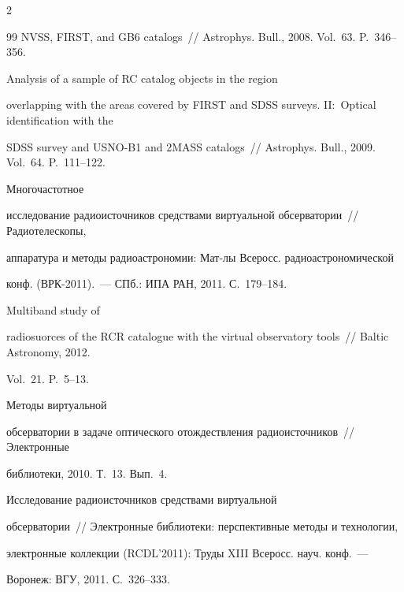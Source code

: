 \begin{multicols}{2}
{{\begin{thebibliography}{99}
NVSS, FIRST, and GB6 catalogs~// Astrophys. Bull., 2008. Vol.~63. P.~346--356.


 Analysis of a sample of RC catalog objects in the region 

overlapping with the areas covered by FIRST and SDSS surveys. II:~Optical identification with the 

SDSS survey and USNO-B1 and 2MASS catalogs~// Astrophys. Bull., 2009. Vol.~64. P.~111--122. 




 Многочастотное 

исследование радиоисточников средствами виртуальной обсерватории~// Радиотелескопы, 

аппаратура и методы радиоастрономии: Мат-лы Всеросс. радиоастрономической 

конф. (ВРК-2011).~---  СПб.: ИПА РАН, 2011. С.~179--184. 




 Multiband study of 

radiosuorces of the RCR catalogue with the virtual observatory tools~// Baltic Astronomy, 2012. 

Vol.~21. P.~5--13. 





Методы виртуальной 

обсерватории в задаче оптического отождествления радиоисточников~// Электронные 

библиотеки, 2010. Т.~13. Вып.~4. 


 Исследование радиоисточников средствами виртуальной 

обсерватории~// Электронные библиотеки: перспективные методы и технологии, 

электронные коллекции (RCDL'2011): Труды \mbox{XIII} Всеросс. науч. конф.~--- 

Воронеж: ВГУ, 2011. С.~326--333. 



\end{thebibliography}}}
\end{multicols}
